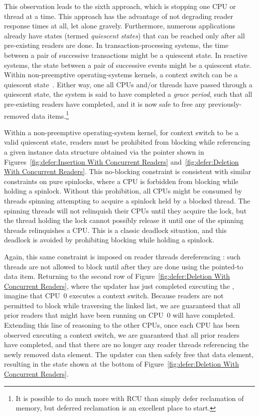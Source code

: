 This observation leads to the sixth approach, which is stopping
one CPU or thread at a time.
This approach has the advantage of not degrading reader response times
at all, let alone gravely.
Furthermore, numerous applications already have states (termed
\emph{quiescent states}) that can be
reached only after all pre-existing readers are done.
In transaction-processing systems, the time between a pair of
successive transactions might be a quiescent state.
In reactive systems, the state between a pair of successive events
might be a quiescent state.
Within non-preemptive operating-systems kernels, a context switch can be
a quiescent state~\cite{McKenney98}.
Either way, one all CPUs and/or threads have passed through a quiescent
state, the system is said to have completed a \emph{grace period},
such that all pre-existing readers have completed, and it is now
safe to free any previously-removed data items.\footnote{
	It is possible to do much more with RCU than simply defer
	reclamation of memory, but deferred reclamation is an
	excellent place to start.}

Within a non-preemptive operating-system kernel, for context switch to be
a valid quiescent state, readers must be prohibited from blocking while
referencing a given instance data structure obtained via the 
pointer shown in
Figures~\ref{fig:defer:Insertion With Concurrent Readers}
and~\ref{fig:defer:Deletion With Concurrent Readers}.
This no-blocking constraint is consistent with similar constraints
on pure spinlocks, where a CPU is forbidden from blocking while
holding a spinlock.
Without this prohibition, all CPUs might be consumed by threads
spinning attempting to acquire a spinlock held by a blocked thread.
The spinning threads will not relinquish their CPUs until they acquire
the lock, but the thread holding the lock cannot possibly release it
until one of the spinning threads relinquishes a CPU.
This is a classic deadlock situation, and this deadlock is avoided
by prohibiting blocking while holding a spinlock.

Again, this same constraint is imposed on reader threads dereferencing
: such threads are not allowed to block until after
they are done using the pointed-to data item.
Returning to the second row of
Figure~\ref{fig:defer:Deletion With Concurrent Readers},
where the updater has just completed executing the ,
imagine that CPU~0 executes a context switch.
Because readers are not permitted to block while traversing the linked
list, we are guaranteed that all prior readers that might have been running on
CPU~0 will have completed.
Extending this line of reasoning to the other CPUs, once each CPU has
been observed executing a context switch, we are guaranteed that all
prior readers have completed, and that there are no longer any reader
threads referencing the newly removed data element.
The updater can then safely free that data element, resulting in the
state shown at the bottom of
Figure~\ref{fig:defer:Deletion With Concurrent Readers}.

